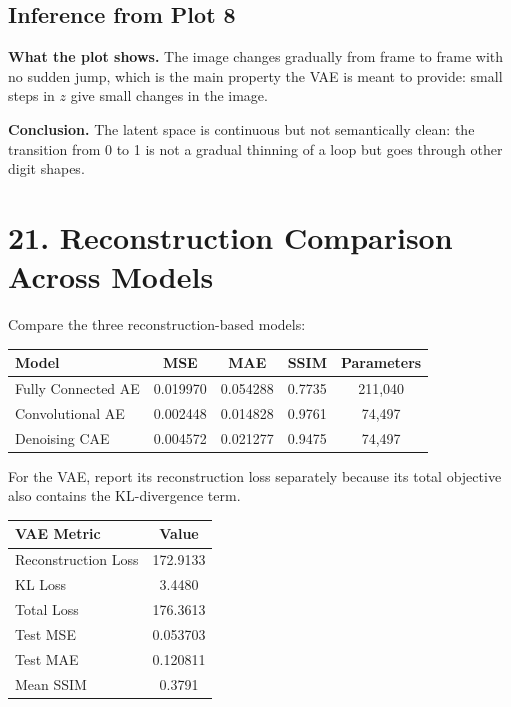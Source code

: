 \documentclass[10pt]{article}
\begin{document}
\subsection*{Inference from Plot 8}

\textbf{What the plot shows.} The image changes gradually from frame to frame
with no sudden jump, which is the main property the VAE is meant to provide: small
steps in $z$ give small changes in the image.

\textbf{Conclusion.} The latent space is continuous but not semantically clean:
the transition from 0 to 1 is not a gradual thinning of a loop but goes through
other digit shapes.

\section*{21. Reconstruction Comparison Across Models}

Compare the three reconstruction-based models:

\begin{center}
\begin{tabular}{|l|c|c|c|c|}
\hline
Model & MSE & MAE & SSIM & Parameters\\
\hline
Fully Connected AE & 0.019970 & 0.054288 & 0.7735 & 211,040\\
Convolutional AE & 0.002448 & 0.014828 & 0.9761 & 74,497\\
Denoising CAE & 0.004572 & 0.021277 & 0.9475 & 74,497\\
\hline
\end{tabular}
\end{center}

For the VAE, report its reconstruction loss separately because its total
objective also contains the KL-divergence term.

\begin{center}
\begin{tabular}{|l|c|}
\hline
VAE Metric & Value\\
\hline
Reconstruction Loss & 172.9133\\
KL Loss & 3.4480\\
Total Loss & 176.3613\\
Test MSE & 0.053703\\
Test MAE & 0.120811\\
Mean SSIM & 0.3791\\
\hline
\end{tabular}
\end{center}
\end{document}
